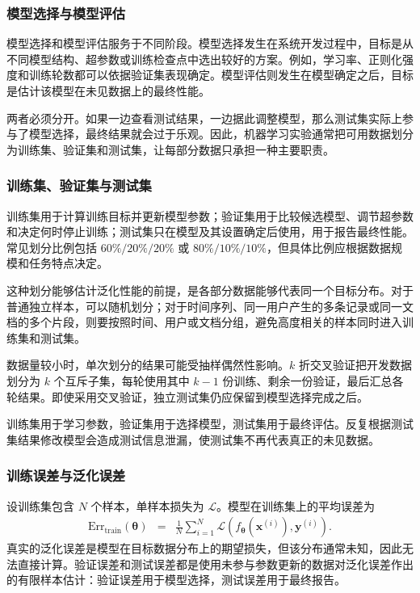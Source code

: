 \subsubsection{模型选择与模型评估}

模型选择和模型评估服务于不同阶段。模型选择发生在系统开发过程中，目标是从不同模型结构、超参数或训练检查点中选出较好的方案。例如，学习率、正则化强度和训练轮数都可以依据验证集表现确定。模型评估则发生在模型确定之后，目标是估计该模型在未见数据上的最终性能。

两者必须分开。如果一边查看测试结果，一边据此调整模型，那么测试集实际上参与了模型选择，最终结果就会过于乐观。因此，机器学习实验通常把可用数据划分为训练集、验证集和测试集，让每部分数据只承担一种主要职责。

\subsubsection{训练集、验证集与测试集}

训练集用于计算训练目标并更新模型参数；验证集用于比较候选模型、调节超参数和决定何时停止训练；测试集只在模型及其设置确定后使用，用于报告最终性能。常见划分比例包括 $60\%/20\%/20\%$ 或 $80\%/10\%/10\%$，但具体比例应根据数据规模和任务特点决定。

这种划分能够估计泛化性能的前提，是各部分数据能够代表同一个目标分布。对于普通独立样本，可以随机划分；对于时间序列、同一用户产生的多条记录或同一文档的多个片段，则要按照时间、用户或文档分组，避免高度相关的样本同时进入训练集和测试集。

数据量较小时，单次划分的结果可能受抽样偶然性影响。$k$ 折交叉验证把开发数据划分为 $k$ 个互斥子集，每轮使用其中 $k-1$ 份训练、剩余一份验证，最后汇总各轮结果。即使采用交叉验证，独立测试集仍应保留到模型选择完成之后。

\begin{importantnote}
  训练集用于学习参数，验证集用于选择模型，测试集用于最终评估。反复根据测试集结果修改模型会造成测试信息泄漏，使测试集不再代表真正的未见数据。
\end{importantnote}

\subsubsection{训练误差与泛化误差}

设训练集包含 $N$ 个样本，单样本损失为 $\mathcal{L}$。模型在训练集上的平均误差为
\begin{eqnarray}
\mathrm{Err}_{\mathrm{train}}(\boldsymbol{\theta})
& = &
\frac{1}{N}
\sum_{i=1}^{N}
\mathcal{L}\!\left(
f_{\boldsymbol{\theta}}(\mathbf{x}^{(i)}),
\mathbf{y}^{(i)}
\right).
\end{eqnarray}
真实的泛化误差是模型在目标数据分布上的期望损失，但该分布通常未知，因此无法直接计算。验证误差和测试误差都是使用未参与参数更新的数据对泛化误差作出的有限样本估计：验证误差用于模型选择，测试误差用于最终报告。

